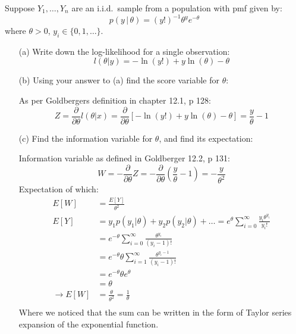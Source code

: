 \documentclass{article}
\newcommand{\1}{\mathbf{1}}
\begin{document}
Suppose $Y_1,\ldots, Y_n$ are an i.i.d.~sample from a population with pmf given by:
\begin{equation}
    p(y\, |\, \theta) = (y!)^{-1} \theta^y e^{-\theta} 
\end{equation}
where {$\theta > 0$}, $y_i \in \{0,1,\ldots \}$.
\begin{itemize}
    \item[(a)] Write down the log-likelihood for a single observation:
    $$l(\theta|y) = -\ln(y!) + y\ln(\theta) - \theta$$

    \item[(b)] Using your answer to (a) find the score variable for $\theta$:
    
    As per Goldbergers definition in chapter 12.1, p 128:
    $$ Z = \frac{\partial}{\partial\theta} l(\theta|x) = \frac{\partial}{\partial\theta}\left[  -\ln(y!) + y\ln(\theta) - \theta  \right] = \frac{y}{\theta} -1$$

    \item[(c)] Find the information variable for $\theta$, and find its expectation:
    
    Information variable as defined in Goldberger 12.2, p 131:
    $$W = -\frac{\partial}{\partial\theta} Z = -\frac{\partial}{\partial\theta } \left(\frac{y}{\theta} -1\right) = - \frac{y}{\theta^2}$$
    Expectation of which:
    \begin{align*}
        E[W] &= \frac{E[Y]}{\theta^2} \\
        E[Y] &= y_1p(y_1|\theta) + y_2p(y_2|\theta) + \hdots = e^\theta \sum_{i=0}^\infty \frac{y_i\theta^{y_i}}{y_i!} \\
        &= e^{-\theta} \sum_{i=0}^\infty \frac{\theta^{y_i}}{(y_i-1)!} \\
        &= e^{-\theta} \theta \sum_{i=1}^\infty \frac{\theta^{y_i-1}}{(y_i-1)!} \\
        &= e^{-\theta} \theta e^\theta \\
        &= \theta \\
        \rightarrow  E[W] &= \frac{\theta}{\theta^2} = \frac{1}{\theta}\\
    \end{align*}
    Where we noticed that the sum can be written in the form of Taylor series expansion of the exponential function. 


\end{itemize}
\end{document}
